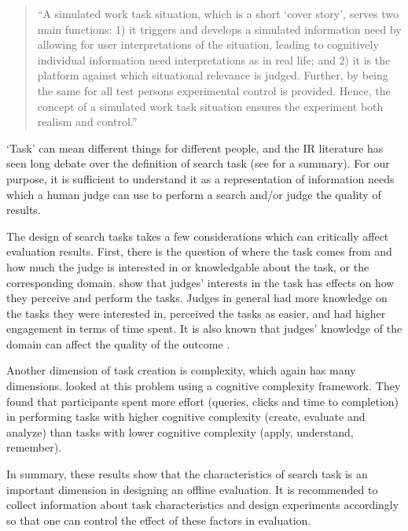 
\begin{quote}
``A simulated work task situation, which is a short `cover story', serves two main functions: 1) it triggers and develops a simulated information need by allowing for user interpretations of the situation, leading to cognitively individual information need interpretations as in real life; and 2) it is the platform against which situational relevance is judged. Further, by being the same for all test persons experimental control is provided. Hence, the concept of a simulated work task situation ensures the experiment both realism and control.''
\end{quote}

`Task' can mean different things for different people, and the IR literature has seen long debate over the definition of search task (see \cite{kelly2009methods} for a summary). For our purpose, it is sufficient to understand it as a representation of information needs which a human judge can use to perform a search and/or judge the quality of results.

The design of search tasks takes a few considerations which can critically affect evaluation results. First, there is the question of where the task comes from and how much the judge is interested in or knowledgable about the task, or the corresponding domain. \cite{Edwards:2016} show that judges' interests in the task has effects on how they perceive and perform the tasks. Judges in general had more knowledge on the tasks they were interested in, perceived the tasks as easier, and had higher engagement in terms of time spent. It is also known that judges' knowledge of the domain can affect the quality of the outcome \citep{Bailey:2008}.

Another dimension of task creation is complexity, which again has many dimensions. \cite{Kelly:2015} looked at this problem using a cognitive complexity framework. They found that participants spent more effort (queries, clicks and time to completion) in performing tasks with higher cognitive complexity (create, evaluate and analyze) than tasks with lower cognitive complexity (apply, understand, remember). 

In summary, these results show that the characteristics of search task is an important dimension in designing an offline evaluation. It is recommended to collect information about task characteristics and design experiments accordingly so that one can control the effect of these factors in evaluation.


